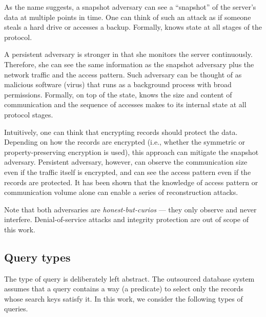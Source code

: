 			As the name suggests, a snapshot adversary can see a ``snapshot'' of the server's data at multiple points in time.
			One can think of such an attack as if someone steals a hard drive or accesses a backup.
			Formally, \adversary{} knows \server{} state at all stages of the protocol.

			A persistent adversary is stronger in that she monitors the server continuously.
			Therefore, she can see the same information as the snapshot adversary plus the network traffic and the access pattern.
			Such adversary can be thought of as malicious software (virus) that runs as a background process with broad permissions.
			Formally, on top of the \server{} state, \adversary{} knows the size and content of \server{} communication and the sequence of accesses \server{} makes to its internal state at all protocol stages.

			Intuitively, one can think that encrypting records should protect the data.
			Depending on how the records are encrypted (i.e., whether the symmetric or property-preserving encryption is used), this approach can mitigate the snapshot adversary.
			Persistent adversary, however, can observe the communication size even if the traffic itself is encrypted, and can see the access pattern even if the records are protected.
			It has been shown that the knowledge of access pattern \cite{multidimensional-range-queries, inference-attack-islam-14, leakage-abuse-attacks-cash-15, inference-attacks-naveed-15, generic-attacks-kellaris, attacks-tao-of-inference, grubbs-attacks, access-pattern-disclosure, attacks-improved-reconstruction} or communication volume \cite{generic-attacks-kellaris, state-of-uniform, attacks-improved-reconstruction, pump-volume-attacks, volume-range-attacks} alone can enable a series of reconstruction attacks.

			Note that both adversaries are \emph{honest-but-curios} --- they only observe and never interfere.
			Denial-of-service attacks and integrity protection are out of scope of this work.

		\subsection{Query types}\label{section:intro:model:query-types}

			The type of query \query{} is deliberately left abstract.
			The outsourced database system assumes that a query contains a way (a predicate) to select only the records whose search keys satisfy it.
			In this work, we consider the following types of queries.

